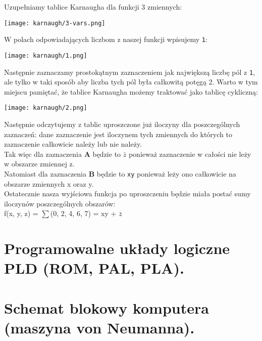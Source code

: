 \documentclass[main.tex]{subfiles}
\begin{document}
    \noindent Uzupełniamy tablice Karnaugha dla funkcji 3 zmiennych: \\

    \begin{center}
        \texttt{[image: karnaugh/3-vars.png]}
    \end{center}

    \noindent W polach odpowiadających liczbom z naszej funkcji wpisujemy \texttt{1}: \\

    \begin{center}
        \texttt{[image: karnaugh/1.png]}
    \end{center}

    \noindent Następnie zaznaczamy prostokątnym zaznaczeniem jak największą liczbę pól z \texttt{1}, ale tylko w taki sposób aby liczba tych pól była całkowitą potęgą 2.
    Warto w tym miejscu pamiętać, że tablice Karnaugha możemy traktować jako tablicę cykliczną: \\

    \begin{center}
        \texttt{[image: karnaugh/2.png]}
    \end{center}

    \noindent Następnie odczytujemy z tablic uproszczone już iloczyny dla poszczególnych zaznaczeń: dane zaznaczenie jest iloczynem tych zmiennych do których to zaznaczenie całkowicie należy lub nie należy. \\
    \noindent Tak więc dla zaznaczenia \textbf{\color[HTML]{ff0000}A} będzie to $\bar{z}$ ponieważ zaznaczenie w całości nie leży w obszarze zmiennej z. \\
    \noindent Natomiast dla zaznaczenia \textbf{\color[HTML]{00ff00}B} będzie to \texttt{xy} ponieważ leży ono całkowicie na obszarze zmiennych x oraz y. \\

    \noindent Ostatecznie nasza wyjściowa funkcja po uproszczeniu będzie miała postać sumy iloczynów poszczególnych obszarów: \\
    \noindent f(x, y, z) = $\sum$(0, 2, 4, 6, 7) = xy + $\bar{z}$

    \newpage

    \section{Programowalne układy logiczne PLD (ROM, PAL, PLA).}
    \section{Schemat blokowy komputera (maszyna von Neumanna).}
\end{document}
